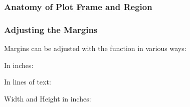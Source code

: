\documentclass[12pt]{beamer}\usepackage[]{graphicx}\usepackage[]{color}
\begin{document}

\begin{frame}
\begin{center}
\Huge{}
\end{center}
\end{frame}


\begin{frame}
\frametitle{Anatomy of Plot Frame and Region}
\begin{center}
\end{center}
\end{frame}


\begin{frame}[fragile]
\frametitle{Adjusting the Margins}

Margins can be adjusted with the  function in various ways:
\bi
  \item In inches: 
  \item In lines of text: 
  \item Width and Height in inches: 
\ei

\end{frame}

\end{document}
